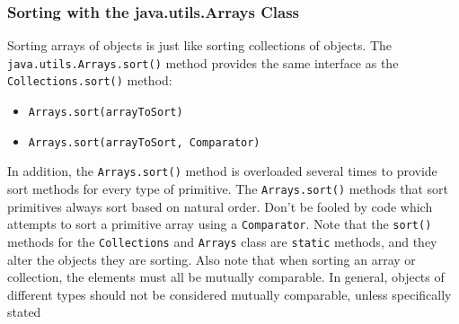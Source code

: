 \subsubsection{Sorting with the java.utils.Arrays Class}
Sorting arrays of objects is just like sorting collections of objects. The 
\verb#java.utils.Arrays.sort()# method provides the same interface as the 
\verb#Collections.sort()# method:
\begin{itemize}
    \item \verb#Arrays.sort(arrayToSort)#
    \item \verb#Arrays.sort(arrayToSort, Comparator)#
\end{itemize}
In addition, the \verb#Arrays.sort()# method is overloaded several times to 
provide sort methods for every type of primitive. The \verb#Arrays.sort()# 
methods that sort primitives always sort based on natural order. Don't be 
fooled by code which attempts to sort a primitive array using a 
\verb#Comparator#. Note that the \verb#sort()# methods for the 
\verb#Collections# and \verb#Arrays# class are \verb#static# methods, and they 
alter the objects they are sorting. Also note that when sorting an array or 
collection, the elements must all be mutually comparable. In general, objects 
of different types should not be considered mutually comparable, unless 
specifically stated

